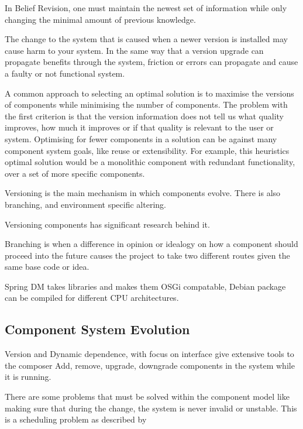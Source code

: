 In Belief Revision, one must maintain the newest set of information while only changing the minimal amount of previous knowledge. 

The change to the system that is caused when a newer version is installed may cause harm to your system.
In the same way that a version upgrade can propagate benefits through the system, 
friction or errors can propagate and cause a faulty or not functional system.

A common approach to selecting an optimal solution is to
maximise the versions of components while minimising the number of components.
The problem with the first criterion is that the version information does not tell us what quality improves, 
how much it improves or if that quality is relevant to the user or system.
Optimising for fewer components in a solution can be against many component system goals, like reuse or extensibility.
For example, this heuristics optimal solution would be a monolithic component with redundant functionality, over 
a set of more specific components. 


Versioning is the main mechanism in which components evolve.
There is also branching, and environment specific altering.

Versioning components has significant research behind it.

Branching is when a difference in opinion or idealogy on how a component should proceed into the future
causes the project to take two different routes given the same base code or idea.

Spring DM takes libraries and makes them OSGi compatable, 
Debian package can be compiled for different CPU architectures.


\subsection{Component System Evolution}
Version and Dynamic dependence, with focus on interface give extensive tools to the composer 
Add, remove, upgrade, downgrade components in the system while it is running.

There are some problems that must be solved within the component model like making sure that during the change,
the system is never invalid or unstable. 
This is a scheduling problem as described by %

